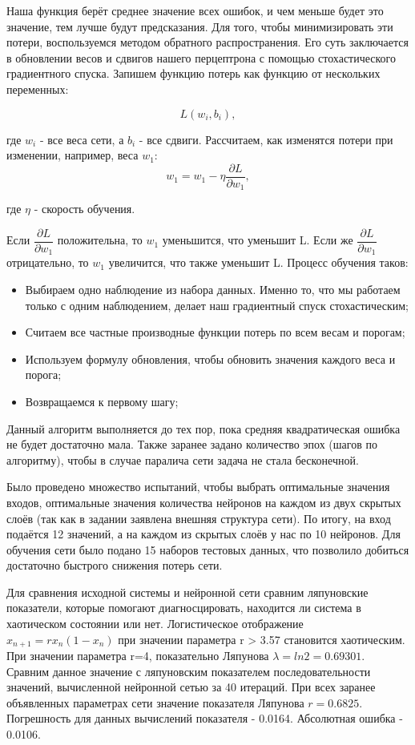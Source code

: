 \documentclass[a4paper]{article}
\begin{document}
Наша функция берёт среднее значение всех ошибок, и чем меньше будет это значение, тем лучше будут предсказания. Для того, чтобы минимизировать эти потери, воспользуемся методом обратного распространения. Его суть заключается в обновлении весов и сдвигов нашего перцептрона с помощью стохастического градиентного спуска. Запишем функцию потерь как функцию от нескольких переменных:

\begin{equation*}
L(w_i, b_i),
\end{equation*}

где $w_i$ - все веса сети, а $b_i$ - все сдвиги. Рассчитаем, как изменятся потери при изменении, например, веса $w_1$:
\begin{equation*}
w_1 = w_1 - \eta \dfrac{\partial L}{\partial w_1},
\end{equation*}

где $\eta$ - скорость обучения.

Если $\dfrac{\partial L}{\partial w_1}$ положительна, то $w_1$ уменьшится, что уменьшит L. Если же $\dfrac{\partial L}{\partial w_1}$ отрицательно, то $w_1$ увеличится, что также уменьшит L. Процесс обучения таков:
\begin{itemize}
\item Выбираем одно наблюдение из набора данных. Именно то, что мы работаем только с одним наблюдением, делает наш градиентный спуск стохастическим;
\item Считаем все частные производные функции потерь по всем весам и порогам;
\item Используем формулу обновления, чтобы обновить значения каждого веса и порога;
\item Возвращаемся к первому шагу;
\end{itemize}

Данный алгоритм выполняется до тех пор, пока средняя квадратическая ошибка не будет достаточно мала. Также заранее задано количество эпох (шагов по алгоритму), чтобы в случае паралича сети задача не стала бесконечной. 

Было проведено множество испытаний, чтобы выбрать оптимальные значения входов, оптимальные значения количества нейронов на каждом из двух скрытых слоёв (так как в задании заявлена внешняя структура сети). По итогу, на вход подаётся 12 значений, а на каждом из скрытых слоёв у нас по 10 нейронов. Для обучения сети было подано 15 наборов тестовых данных, что позволило добиться достаточно быстрого снижения потерь сети. 


Для сравнения исходной системы и нейронной сети сравним ляпуновские показатели, которые помогают диагносцировать, находится ли система в хаотическом состоянии или нет. Логистическое отображение $x_{n+1} = rx_n(1-x_n)$ при значении параметра r > 3.57 становится хаотическим. При значении параметра r=4, показательно Ляпунова $\lambda = ln2 = 0.69301$. Сравним данное значение с ляпуновским показателем последовательности значений, вычисленной нейронной сетью за 40 итераций. При всех заранее объявленных параметрах сети значение показателя Ляпунова $r = 0.6825$. Погрешность для данных вычислений показателя - 0.0164. Абсолютная ошибка - 0.0106.
\end{document}
